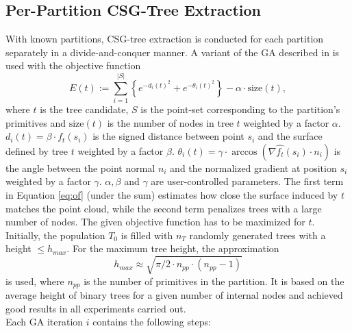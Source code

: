 \subsection{Per-Partition \ac{CSG}-Tree Extraction}
\label{ch:ga}
With known partitions, \ac{CSG}-tree extraction is conducted for each partition separately in a divide-and-conquer manner.
A variant of the \ac{GA} described in \cite{fayolle2016evolutionary} is used with the objective function
\begin{equation}
\label{eq:of}
E(t) := \sum_{i=1}^{|S|}\left\{e^{-d_i(t)^2}+e^{-\theta_i(t)^2}\right\}-\alpha \cdot \text{size}(t),
\end{equation}
where $t$ is the tree candidate, $S$ is the point-set corresponding to the partition's primitives and $\text{size}(t)$ is the number of nodes in tree $t$ weighted by a factor $\alpha$.
$d_i(t) = \beta \cdot f_t(s_i)$ is the signed distance between point $s_i$ and the surface defined by tree $t$ weighted by a factor $\beta$.
$\theta_i(t) = \gamma \cdot  \arccos(\nabla \hat{f_t}(s_i) \cdot n_i)$ is the angle between the point normal $n_i$ and the normalized gradient at position $s_i$ weighted by a factor $\gamma$.  
$\alpha, \beta$ and $\gamma$ are user-controlled parameters. 
The first term in Equation \ref{eq:of} (under the sum) estimates how close the surface induced by $t$ matches the point cloud, while the second term penalizes trees with a large number of nodes.
The given objective function has to be maximized for $t$.
\\
Initially, the population $T_0$ is filled with $n_T$ randomly generated trees with a height $\le h_{max}$. 
For the maximum tree height, the approximation  
\begin{equation}
\label{eq:hmax}
h_{max}\approx \sqrt{\pi/2 \cdot n_{pp}\cdot(n_{pp}-1)}
\end{equation}
is used, where $n_{pp}$ is the number of primitives in the partition.
It is based on the average height of binary trees for a given number of internal nodes \cite{flajolet1982TheAH} and achieved good results in all experiments carried out. 
\\
Each \ac{GA} iteration $i$ contains the following steps:
